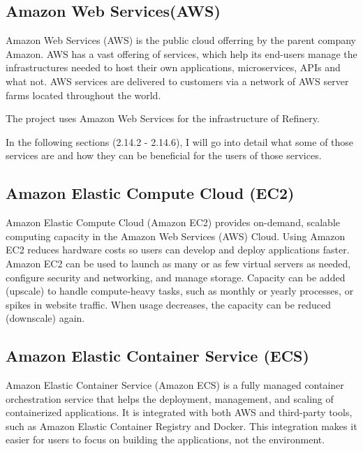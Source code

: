 	\subsection{Amazon Web Services(AWS)} \label{backgraws}
		Amazon Web Services (AWS) \cite{aws} is the public cloud offerring by the parent company Amazon. AWS has a vast offering
		of services, which help its end-users manage the infrastructures needed to host their own applications, 
		microservices, APIs and what not.
		AWS services are delivered to customers via a network of AWS server farms located throughout the world.

		The project uses Amazon Web Services for the infrastructure of Refinery.

		In the following sections (2.14.2 - 2.14.6), I will go into detail what some of those services are and how
		they can be beneficial for the users of those services.

	\subsection{Amazon Elastic Compute Cloud (EC2)} \label{backgrec2}
		Amazon Elastic Compute Cloud (Amazon EC2) \cite{ec2} provides on-demand, scalable computing capacity in the Amazon 
		Web Services (AWS) Cloud. Using Amazon EC2 reduces hardware costs so users can develop and deploy applications faster. 
		Amazon EC2 can be used to launch as many or as few virtual servers as needed, configure security and networking, 
		and manage storage. Capacity can be added (upscale) to handle compute-heavy tasks, such as monthly or yearly processes,
		or spikes in website traffic. When usage decreases, the capacity can be reduced (downscale) again.

	\subsection{Amazon Elastic Container Service (ECS)} \label{backgecs}
		Amazon Elastic Container Service (Amazon ECS) \cite{ecs} is a fully managed container orchestration service that helps 
		the deployment, management, and scaling of containerized applications. It is integrated with both AWS and third-party tools, 
		such as Amazon Elastic Container Registry and Docker. This integration makes it easier for users to focus on 
		building the applications, not the environment. 

